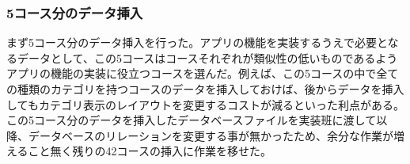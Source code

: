 ﻿\subsubsection{5コース分のデータ挿入}
まず5コース分のデータ挿入を行った。アプリの機能を実装するうえで必要となるデータとして、この5コースはコースそれぞれが類似性の低いものであるようアプリの機能の実装に役立つコースを選んだ。例えば、この5コースの中で全ての種類のカテゴリを持つコースのデータを挿入しておけば、後からデータを挿入してもカテゴリ表示のレイアウトを変更するコストが減るといった利点がある。この5コース分のデータを挿入したデータベースファイルを実装班に渡して以降、データベースのリレーションを変更する事が無かったため、余分な作業が増えること無く残りの42コースの挿入に作業を移せた。
